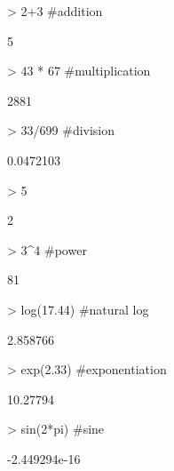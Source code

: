 \begin{Schunk}
\begin{Sinput}
> 2+3 #addition
\end{Sinput}
\begin{Soutput}
[1] 5
\end{Soutput}
\begin{Sinput}
> 43 * 67 #multiplication
\end{Sinput}
\begin{Soutput}
[1] 2881
\end{Soutput}
\begin{Sinput}
> 33/699 #division
\end{Sinput}
\begin{Soutput}
[1] 0.0472103
\end{Soutput}
\begin{Sinput}
> 5%%3   #modulo (remainer)
\end{Sinput}
\begin{Soutput}
[1] 2
\end{Soutput}
\begin{Sinput}
> 3^4 #power
\end{Sinput}
\begin{Soutput}
[1] 81
\end{Soutput}
\begin{Sinput}
> log(17.44) #natural log
\end{Sinput}
\begin{Soutput}
[1] 2.858766
\end{Soutput}
\begin{Sinput}
> exp(2.33)  #exponentiation
\end{Sinput}
\begin{Soutput}
[1] 10.27794
\end{Soutput}
\begin{Sinput}
> sin(2*pi)  #sine
\end{Sinput}
\begin{Soutput}
[1] -2.449294e-16
\end{Soutput}
\end{Schunk}
